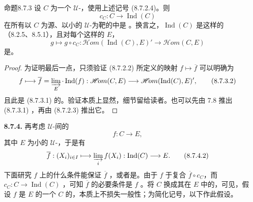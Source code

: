 \begin{SGAresult}{命题}{8.7.3}
设 $C$ 为一个 $\mathcal U$-，使用上述记号 (8.7.2.4)。则
\[
c_C:C\longrightarrow\operatorname{Ind}(C)
\]
在所有以 $C$ 为源、以小的 $\mathcal U$-为靶的中是 。换言之，$\operatorname{Ind}(C)$ 是这样的（8.2.5、8.5.1），且对每个这样的 $E$，
\[
g\longmapsto g\circ c_C:
\mathscr{H}\!om(\operatorname{Ind}(C),E)'\longrightarrow\mathscr{H}\!om(C,E)\tag{8.7.3.1}
\]
是。
\end{SGAresult}
\begin{proof}
为证明最后一点，只须验证 (8.7.2.2) 所定义的映射 $f\mapsto\overline f$ 可以明确为
\[
f\longmapsto\overline f=\varinjlim_E\cdot\operatorname{Ind}(f):
\mathscr{H}\!om(C,E)\longrightarrow\mathscr{H}\!om(\operatorname{Ind}(C),E)',\tag{8.7.3.2}
\]
且此是 (8.7.3.1) 的。验证本质上显然，细节留给读者。也可以先由 7.8 推出 (8.7.3.1) ，再由 (8.7.2.3) 推出它。
\end{proof}
\textbf{8.7.4.} 再考虑 $\mathcal U$-间的
\[
f:C\longrightarrow E,\tag{8.7.4.1}
\]
其中 $E$ 为小的 $\mathcal U$-，于是有
\[
\overline f:(X_i)_{i\in I}\longmapsto\varinjlim_i f(X_i):\operatorname{Ind}(C)\longrightarrow E.\tag{8.7.4.2}
\]
下面研究 $f$ 上的什么条件能保证 $\overline f$ ，或者是。由于 $f$ 于复合 $\overline f\circ c_C$，而 $c_C:C\to\operatorname{Ind}(C)$ ，可知 $\overline f$ 
的必要条件是 $f$ 。将 $C$ 换成其在 $E$ 中的，可见，假设 $f$ 是 $E$ 的一个 $C$ 的，本质上不损失一般性；为简化记号，以下作此假设。
